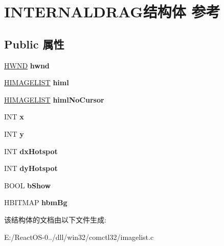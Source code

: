 \hypertarget{struct_i_n_t_e_r_n_a_l_d_r_a_g}{}\section{I\+N\+T\+E\+R\+N\+A\+L\+D\+R\+A\+G结构体 参考}
\label{struct_i_n_t_e_r_n_a_l_d_r_a_g}
\subsection*{Public 属性}
\begin{DoxyCompactItemize}
\item 
\mbox{\label{struct_i_n_t_e_r_n_a_l_d_r_a_g_a6d262f21603173c62f43655b21fa5394}} 
\hyperlink{interfacevoid}{H\+W\+ND} {\bfseries hwnd}
\item 
\mbox{\label{struct_i_n_t_e_r_n_a_l_d_r_a_g_a53320eb86a40efdf0aa9b635038cb178}} 
\hyperlink{struct___i_m_a_g_e_l_i_s_t}{H\+I\+M\+A\+G\+E\+L\+I\+ST} {\bfseries himl}
\item 
\mbox{\label{struct_i_n_t_e_r_n_a_l_d_r_a_g_a1223de6e10020b5866ce22dc52afc8bd}} 
\hyperlink{struct___i_m_a_g_e_l_i_s_t}{H\+I\+M\+A\+G\+E\+L\+I\+ST} {\bfseries himl\+No\+Cursor}
\item 
\mbox{\label{struct_i_n_t_e_r_n_a_l_d_r_a_g_abf8ae2b03bd851298f88140b9295332d}} 
I\+NT {\bfseries x}
\item 
\mbox{\label{struct_i_n_t_e_r_n_a_l_d_r_a_g_adf6ae496b2fa5161a565fd109cf9591e}} 
I\+NT {\bfseries y}
\item 
\mbox{\label{struct_i_n_t_e_r_n_a_l_d_r_a_g_a3fede2d4bb021217324669409cc65c94}} 
I\+NT {\bfseries dx\+Hotspot}
\item 
\mbox{\label{struct_i_n_t_e_r_n_a_l_d_r_a_g_a228e09f04e3ecc7e1b6e2741813b643f}} 
I\+NT {\bfseries dy\+Hotspot}
\item 
\mbox{\label{struct_i_n_t_e_r_n_a_l_d_r_a_g_a9d5c92274b0b272011f5045b83fba880}} 
B\+O\+OL {\bfseries b\+Show}
\item 
\mbox{\label{struct_i_n_t_e_r_n_a_l_d_r_a_g_a06ce99ab28bddda1fac2fa0148bd61a3}} 
H\+B\+I\+T\+M\+AP {\bfseries hbm\+Bg}
\end{DoxyCompactItemize}


该结构体的文档由以下文件生成\+:\begin{DoxyCompactItemize}
\item 
E\+:/\+React\+O\+S-\/0../dll/win32/comctl32/imagelist.\+c\end{DoxyCompactItemize}
